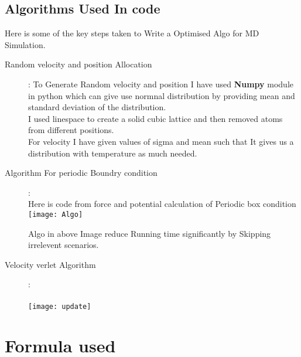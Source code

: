 \documentclass[11pt]{article}
\begin{document}
\subsection{Algorithms Used In code}
Here is some of the key steps taken to Write a Optimised Algo for MD Simulation.
\begin{description}
\item[Random velocity and position Allocation]: \newline
To Generate Random velocity and position I have used {\bf Numpy} module in python which can give use normnal distribution by providing mean and standard deviation of the distribution. \\
I used linespace to create a solid cubic lattice and then removed atoms from different positions.\\
For velocity I have given values of sigma and mean such that It gives us a distribution with temperature as much needed.

\item[Algorithm For periodic Boundry condition]: \\
 Here is code from force and potential calculation of Periodic box condition \\
 
\texttt{[image: Algo]}

\hspace{2cm}
 
Algo in above Image reduce Running time significantly by Skipping irrelevent scenarios.\\
 
\item[Velocity verlet Algorithm]: \\ 
\vspace{.1cm}\\
\texttt{[image: update]}
 
\end{description}

\section{Formula used}
\end{document}
